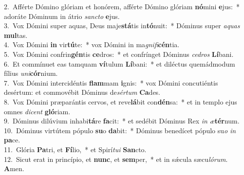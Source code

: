 {2.~}Afférte Dómino glóriam et honórem, afférte Dómino glóriam \textbf{nó}mini \textbf{e}jus:~* adoráte Dóminum in átrio \textit{san}\textit{cto} \textbf{e}jus.\\
{3.~}Vox Dómini super aquas, Deus maje\textbf{stá}tis in\textbf{tó}nuit:~* Dóminus super \textit{a}\textit{quas} \textbf{mul}tas.\\
{4.~}Vox Dómini \textbf{in} vir\textbf{tú}te:~* vox Dómini in ma\textit{gni}\textit{fi}\textbf{cén}tia.\\
{5.~}Vox Dómini confrin\textbf{gén}tis \textbf{ce}dros:~* et confrínget Dóminus \textit{ce}\textit{dros} \textbf{Lí}bani.\\
{6.~}Et commínuet eas tamquam \textbf{ví}tulum \textbf{Lí}bani:~* et diléctus quemádmodum fílius \textit{u}\textit{ni}\textbf{cór}nium.\\
{7.~}Vox Dómini intercidéntis \textbf{flam}mam \textbf{i}gnis:~* vox Dómini concutiéntis desértum: et commovébit Dóminus de\textit{sér}\textit{tum} \textbf{Ca}des.\\
{8.~}Vox Dómini præparántis cervos, et reve\textbf{lá}bit con\textbf{dén}sa:~* et in templo ejus omnes \textit{di}\textit{cent} \textbf{gló}riam.\\
{9.~}Dóminus dilúvium inhabi\textbf{tá}re \textbf{fa}cit:~* et sedébit Dóminus Rex \textit{in} \textit{æ}\textbf{tér}num.\\
{10.~}Dóminus virtútem pópulo \textbf{su}o \textbf{da}bit:~* Dóminus benedícet pópulo su\textit{o} \textit{in} \textbf{pa}ce.\\
{11.~}Glória \textbf{Pa}tri, et \textbf{Fí}lio,~* et Spirí\textit{tu}\textit{i} \textbf{San}cto.\\
{12.~}Sicut erat in princípio, et \textbf{nunc}, et \textbf{sem}per,~* et in sǽcula sæcu\textit{ló}\textit{rum}. \textbf{A}men.\\
